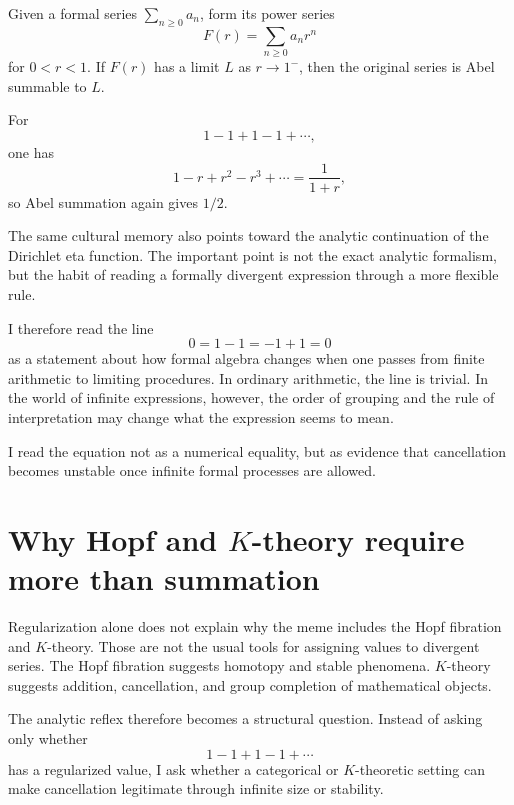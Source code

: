 \begin{definition}
Given a formal series \(\sum_{n\ge0}a_n\), form its power series
\[
  F(r)=\sum_{n\ge0}a_nr^n
\]
for \(0<r<1\).  If \(F(r)\) has a limit \(L\) as \(r\to1^-\), then the original series is Abel summable to \(L\).
\end{definition}

For
\[
  1-1+1-1+\cdots,
\]
one has
\[
  1-r+r^2-r^3+\cdots=\frac{1}{1+r},
\]
so Abel summation again gives \(1/2\).

\begin{remark}
The same cultural memory also points toward the analytic continuation of the Dirichlet eta function.  The important point is not the exact analytic formalism, but the habit of reading a formally divergent expression through a more flexible rule.
\end{remark}

I therefore read the line
\[
  0=1-1=-1+1=0
\]
as a statement about how formal algebra changes when one passes from finite arithmetic to limiting procedures.  In ordinary arithmetic, the line is trivial.  In the world of infinite expressions, however, the order of grouping and the rule of interpretation may change what the expression seems to mean.

\begin{claim}
I read the equation not as a numerical equality, but as evidence that cancellation becomes unstable once infinite formal processes are allowed.
\end{claim}

\section[Why Hopf and K-theory require more than summation]{Why Hopf and \(K\)-theory require more than summation}

Regularization alone does not explain why the meme includes the Hopf fibration and \(K\)-theory.  Those are not the usual tools for assigning values to divergent series.  The Hopf fibration suggests homotopy and stable phenomena.  \(K\)-theory suggests addition, cancellation, and group completion of mathematical objects.

The analytic reflex therefore becomes a structural question.  Instead of asking only whether
\[
  1-1+1-1+\cdots
\]
has a regularized value, I ask whether a categorical or \(K\)-theoretic setting can make cancellation legitimate through infinite size or stability.


